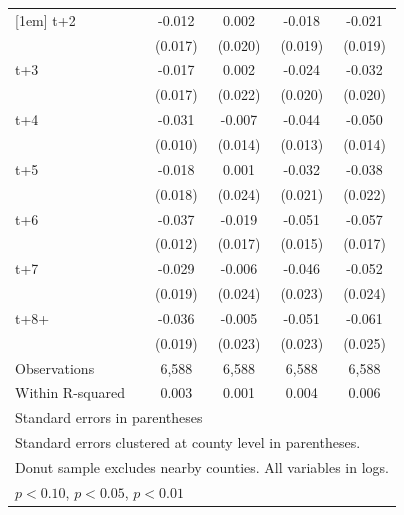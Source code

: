 \begin{table}[htbp]
\begin{tabular}{l*{4}{c}}
[1em]
t+2         &      -0.012         &       0.002         &      -0.018         &      -0.021         \\
            &     (0.017)         &     (0.020)         &     (0.019)         &     (0.019)         \\
[1em]
t+3         &      -0.017         &       0.002         &      -0.024         &      -0.032         \\
            &     (0.017)         &     (0.022)         &     (0.020)         &     (0.020)         \\
[1em]
t+4         &      -0.031\sym{***}&      -0.007         &      -0.044\sym{***}&      -0.050\sym{***}\\
            &     (0.010)         &     (0.014)         &     (0.013)         &     (0.014)         \\
[1em]
t+5         &      -0.018         &       0.001         &      -0.032         &      -0.038\sym{*}  \\
            &     (0.018)         &     (0.024)         &     (0.021)         &     (0.022)         \\
[1em]
t+6         &      -0.037\sym{***}&      -0.019         &      -0.051\sym{***}&      -0.057\sym{***}\\
            &     (0.012)         &     (0.017)         &     (0.015)         &     (0.017)         \\
[1em]
t+7         &      -0.029         &      -0.006         &      -0.046\sym{**} &      -0.052\sym{**} \\
            &     (0.019)         &     (0.024)         &     (0.023)         &     (0.024)         \\
[1em]
t+8+        &      -0.036\sym{*}  &      -0.005         &      -0.051\sym{**} &      -0.061\sym{**} \\
            &     (0.019)         &     (0.023)         &     (0.023)         &     (0.025)         \\
\hline
Observations&       6,588         &       6,588         &       6,588         &       6,588         \\
Within R-squared&       0.003         &       0.001         &       0.004         &       0.006         \\
\hline\hline
\multicolumn{5}{l}{\footnotesize Standard errors in parentheses}\\
\multicolumn{5}{l}{\footnotesize Standard errors clustered at county level in parentheses.}\\
\multicolumn{5}{l}{\footnotesize Donut sample excludes nearby counties. All variables in logs.}\\
\multicolumn{5}{l}{\footnotesize \sym{*} \(p<0.10\), \sym{**} \(p<0.05\), \sym{***} \(p<0.01\)}\\
\end{tabular}
\end{table}
